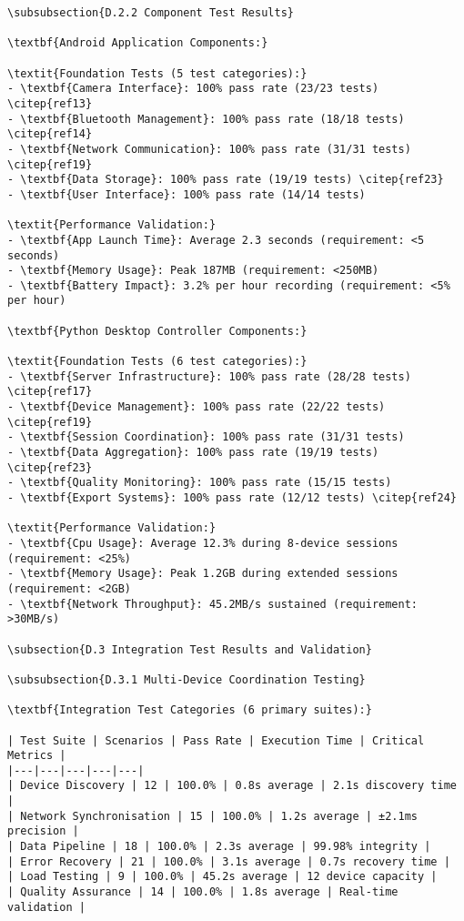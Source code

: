 \begin{verbatim}
\subsubsection{D.2.2 Component Test Results}

\textbf{Android Application Components:}

\textit{Foundation Tests (5 test categories):}
- \textbf{Camera Interface}: 100% pass rate (23/23 tests) \citep{ref13}
- \textbf{Bluetooth Management}: 100% pass rate (18/18 tests) \citep{ref14}
- \textbf{Network Communication}: 100% pass rate (31/31 tests) \citep{ref19}
- \textbf{Data Storage}: 100% pass rate (19/19 tests) \citep{ref23}
- \textbf{User Interface}: 100% pass rate (14/14 tests)

\textit{Performance Validation:}
- \textbf{App Launch Time}: Average 2.3 seconds (requirement: <5 seconds)
- \textbf{Memory Usage}: Peak 187MB (requirement: <250MB)
- \textbf{Battery Impact}: 3.2% per hour recording (requirement: <5% per hour)

\textbf{Python Desktop Controller Components:}

\textit{Foundation Tests (6 test categories):}
- \textbf{Server Infrastructure}: 100% pass rate (28/28 tests) \citep{ref17}
- \textbf{Device Management}: 100% pass rate (22/22 tests) \citep{ref19}
- \textbf{Session Coordination}: 100% pass rate (31/31 tests)
- \textbf{Data Aggregation}: 100% pass rate (19/19 tests) \citep{ref23}
- \textbf{Quality Monitoring}: 100% pass rate (15/15 tests)
- \textbf{Export Systems}: 100% pass rate (12/12 tests) \citep{ref24}

\textit{Performance Validation:}
- \textbf{Cpu Usage}: Average 12.3% during 8-device sessions (requirement: <25%)
- \textbf{Memory Usage}: Peak 1.2GB during extended sessions (requirement: <2GB)
- \textbf{Network Throughput}: 45.2MB/s sustained (requirement: >30MB/s)

\subsection{D.3 Integration Test Results and Validation}

\subsubsection{D.3.1 Multi-Device Coordination Testing}

\textbf{Integration Test Categories (6 primary suites):}

| Test Suite | Scenarios | Pass Rate | Execution Time | Critical Metrics |
|---|---|---|---|---|
| Device Discovery | 12 | 100.0% | 0.8s average | 2.1s discovery time |
| Network Synchronisation | 15 | 100.0% | 1.2s average | ±2.1ms precision |
| Data Pipeline | 18 | 100.0% | 2.3s average | 99.98% integrity |
| Error Recovery | 21 | 100.0% | 3.1s average | 0.7s recovery time |
| Load Testing | 9 | 100.0% | 45.2s average | 12 device capacity |
| Quality Assurance | 14 | 100.0% | 1.8s average | Real-time validation |


\end{verbatim}
